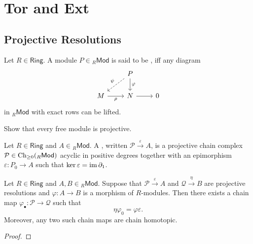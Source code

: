 \section*{Tor and Ext}
\subsection*{Projective Resolutions}

\begin{definition}
	Let $R \in \mathsf{Ring}$. A module $P \in {_R}\mathsf{Mod}$ is said to be , iff any diagram
	\begin{equation*}
		\begin{tikzcd}
			& P \arrow[d,"\varphi"]\arrow[dl,dashed,"\psi"']\\
			M \arrow[r,"\rho"'] & N \arrow[r] & 0
		\end{tikzcd}
	\end{equation*}
	\noindent in $_R\mathsf{Mod}$ with exact rows can be lifted.
\end{definition}

\begin{exercise}
	Show that every free module is projective.
\end{exercise}

\begin{definition}
	Let $R \in \mathsf{Ring}$ and $A \in {_R}\mathsf{Mod}$. A , written $\mathcal{P}\overset{\varepsilon}{\to} A$, is a projective chain complex $\mathcal{P} \in \operatorname{Ch}_{\geq 0}({_R}\mathsf{Mod})$ acyclic in positive degrees together with an epimorphism $\varepsilon : P_0 \to A$ such that $\ker \varepsilon = \operatorname{im} \partial_1$. 
\end{definition}

\begin{theorem}
	\label{thm:comparison_theorem}
	Let $R \in \mathsf{Ring}$ and $A,B \in {_R}\mathsf{Mod}$. Suppose that $\mathcal{P} \overset{\varepsilon}{\to} A$ and $\mathcal{Q} \overset{\eta}{\to} B$ are projective resolutions and $\varphi : A \to B$ is a morphism of $R$-modules. Then there exists a chain map $\varphi_\bullet : \mathcal{P} \to \mathcal{Q}$ such that 
	\begin{equation*}
		\eta\varphi_0 = \varphi\varepsilon.
	\end{equation*}
	Moreover, any two such chain maps are chain homotopic.
\end{theorem}

\begin{proof}
	
\end{proof}


